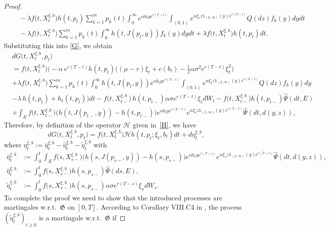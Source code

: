 \documentclass[reqno, 11pt]{amsart}%
\theoremstyle{definition}
\numberwithin{equation}{section} \numberwithin{theorem}{section}
\begin{document}
\begin{proof}
\begin{align*}
&\quad - \lambda f\big(t,X_t^{\xi,b}\big)h(t,p_t)\sum_{k=1}^m p_k(t) \int_0^\infty e^{\alpha b_t y e^{r(T-t)}}\int_{(0,1)}\!e^{\alpha \xi_t z \mathds{1}_{(L,\infty)}(y)e^{r(T-t)}}Q(dz)f_k(y)dydt \\
&\quad - \lambda f\big(t,X_t^{\xi,b}\big)\sum_{k=1}^m p_k(t) \int_0^\infty h(t,J(p_t,y))f_k(y)dydt + \lambda f\big(t,X_t^{\xi,b}\big)h(t,p_t)dt.
\end{align*}
  Substituting this into \eqref{G}, we obtain
\begin{align*}
&dG\big(t,X^{\xi,b}_t,p_t\big) \\
&=f\big(t,X^{\xi,b}_t\big)\bigg(- \alpha\, e^{r(T-t)}h(t,p_t)\Big((\mu-r)\xi_t+c(b_t)-\frac12\alpha\sigma^2 e^{r(T-t)}\xi_t^2\Big) \\
& + \lambda f\big(t,X^{\xi,b}_t\big)\sum_{k=1}^m p_k(t) \int_0^\infty h(t,J(p_t,y))e^{\alpha b_t y e^{r(T-t)}}\int_{(0,1)}\!e^{\alpha \xi_t z \mathds{1}_{(L,\infty)}(y)e^{r(T-t)}}Q(dz)f_k(y)dy\\
& - \lambda\,h(t,p_t) + h_t(t,p_t)\bigg) dt - f\big(t,X^{\xi,b}_{t-}\big)\,h(t,p_{t-})\alpha\sigma e^{r(T-t)} \xi_t dW_t - f\big(t,X^{\xi,b}_{t-}\big)h(t,p_{t-})\hat\Psi(dt,E)\\
& + \int_E f\big(t,X^{\xi,b}_{t-}\big)\big(h(t,J(p_{t-},y))-h(t,p_{t-})\big)e^{\alpha b_t y e^{r(T-t)}}e^{\alpha \xi_t z \mathds{1}_{(L,\infty)}(y) e^{r(T-t)}}\hat{\Psi}(dt, d(y,z)),
\end{align*}
Therefore, by definition of the operator $\mathcal{H}$ given in~\eqref{H}, we have
\begin{equation*}
d G\big(t,X^{\xi,b}_t,p_t\big) = f\big(t,X^{\xi,b}_{t}\big)\mathcal{H} h(t,p_t;\xi_t,b_t)dt + d\eta^{\xi,b}_t,
\end{equation*}
where $\eta^{\xi,b}_t := \bar\eta^{\xi,b}_t - \hat\eta^{\xi,b}_t - \tilde\eta^{\xi,b}_t$
with
\begin{align*}
\bar\eta^{\xi,b}_t &:= \int_0^t \int_E f\big(s,X^{\xi,b}_{s-}\big)\big(h(s,J(p_{s-},y))-h(s,p_{s-})\big)e^{\alpha b_s y e^{r(T-s)}}e^{\alpha \xi_s z \mathds{1}_{(L,\infty)}(y) e^{r(T-s)}}\hat{\Psi}(dt, d(y,z)), \\
\hat\eta^{\xi,b}_t &:=  \int_0^t f\big(s,X^{\xi,b}_{s-}\big)h(s,p_{s-})\hat\Psi(ds,E), \\
\tilde\eta^{\xi,b}_t &:= \int_0^t f\big(s,X^{\xi,b}_{s-}\big)h(s,p_{s-})\alpha \sigma e^{r(T-s)} \xi_s dW_s.
\end{align*}
To complete the proof we need to show that the introduced processes are martingales w.r.t.\ ${\mathfrak G}$ on $[0,T]$. 
According to Corollary VIII.C4 in \cite{bre}, the process $(\tilde\eta^{\xi,b}_t)_{t\ge0}$ is a martingale w.r.t.\ $\mathfrak{G}$ if 

\end{proof}
\end{document}
